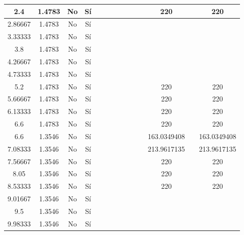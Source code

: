 \begin{table}[H]
{\begin{tabular}{|c|c|c|c|c|c|c|c|c|c|c|c|c|c|}
\hline
2.4 & 1.4783 & No  & Sí  &     &     &     &     &     &     &     & 220 &     & 220 \bigstrut\\
\hline
2.86667 & 1.4783 & No  & Sí  &     &     &     &     &     &     &     &     &     &  \bigstrut\\
\hline
3.33333 & 1.4783 & No  & Sí  &     &     &     &     &     &     &     &     &     &  \bigstrut\\
\hline
3.8 & 1.4783 & No  & Sí  &     &     &     &     &     &     &     &     &     &  \bigstrut\\
\hline
4.26667 & 1.4783 & No  & Sí  &     &     &     &     &     &     &     &     &     &  \bigstrut\\
\hline
4.73333 & 1.4783 & No  & Sí  &     &     &     &     &     &     &     &     &     &  \bigstrut\\
\hline
5.2 & 1.4783 & No  & Sí  &     &     &     &     &     &     &     & 220 &     & 220 \bigstrut\\
\hline
5.66667 & 1.4783 & No  & Sí  &     &     &     &     &     &     &     & 220 &     & 220 \bigstrut\\
\hline
6.13333 & 1.4783 & No  & Sí  &     &     &     &     &     &     &     & 220 &     & 220 \bigstrut\\
\hline
6.6 & 1.4783 & No  & Sí  &     &     &     &     &     &     &     & 220 &     & 220 \bigstrut\\
\hline
6.6 & 1.3546 & No  & Sí  &     &     &     &     &     &     &     & 163.0349408 &     & 163.0349408 \bigstrut\\
\hline
7.08333 & 1.3546 & No  & Sí  &     &     &     &     &     &     &     & 213.9617135 &     & 213.9617135 \bigstrut\\
\hline
7.56667 & 1.3546 & No  & Sí  &     &     &     &     &     &     &     & 220 &     & 220 \bigstrut\\
\hline
8.05 & 1.3546 & No  & Sí  &     &     &     &     &     &     &     & 220 &     & 220 \bigstrut\\
\hline
8.53333 & 1.3546 & No  & Sí  &     &     &     &     &     &     &     & 220 &     & 220 \bigstrut\\
\hline
9.01667 & 1.3546 & No  & Sí  &     &     &     &     &     &     &     &     &     &  \bigstrut\\
\hline
9.5 & 1.3546 & No  & Sí  &     &     &     &     &     &     &     &     &     &  \bigstrut\\
\hline
9.98333 & 1.3546 & No  & Sí  &     &     &     &     &     &     &     &     &     &  \bigstrut\\

\end{tabular}}
\end{table}
